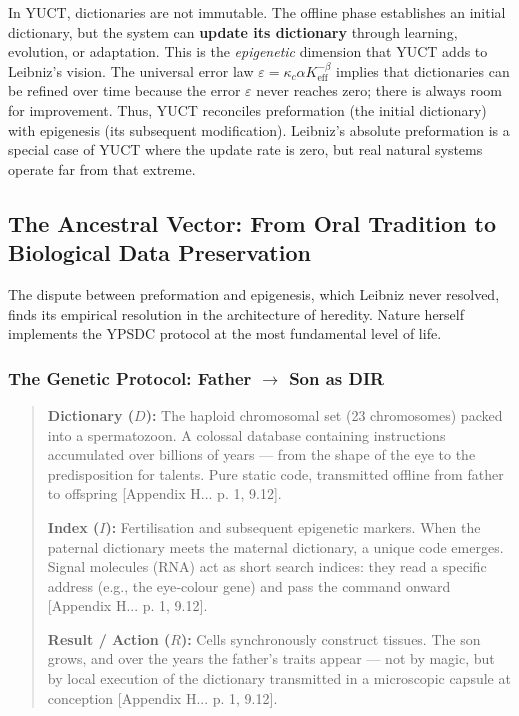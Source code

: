\documentclass[12pt,a4paper]{article}
\begin{document}
	In YUCT, dictionaries are not immutable. The offline phase establishes an initial dictionary, but the system can \textbf{update its dictionary} through learning, evolution, or adaptation. This is the \emph{epigenetic} dimension that YUCT adds to Leibniz’s vision. The universal error law \(\varepsilon = \kappa_c \alpha K_{\mathrm{eff}}^{-\beta}\) implies that dictionaries can be refined over time because the error \(\varepsilon\) never reaches zero; there is always room for improvement. Thus, YUCT reconciles preformation (the initial dictionary) with epigenesis (its subsequent modification). Leibniz’s absolute preformation is a special case of YUCT where the update rate is zero, but real natural systems operate far from that extreme.
	
	\subsection{The Ancestral Vector: From Oral Tradition to Biological Data Preservation}
	\label{subsec:ancestral-vector}
	
	The dispute between preformation and epigenesis, which Leibniz never resolved, finds its empirical resolution in the architecture of heredity. Nature herself implements the YPSDC protocol at the most fundamental level of life.
	
	\subsubsection{The Genetic Protocol: Father $\rightarrow$ Son as DIR}
	
	\begin{quote}
		\textbf{Dictionary ($D$):} The haploid chromosomal set (23 chromosomes) packed into a spermatozoon. A colossal database containing instructions accumulated over billions of years — from the shape of the eye to the predisposition for talents. Pure static code, transmitted offline from father to offspring [Appendix H... p. 1, 9.12].
		
		\textbf{Index ($I$):} Fertilisation and subsequent epigenetic markers. When the paternal dictionary meets the maternal dictionary, a unique code emerges. Signal molecules (RNA) act as short search indices: they read a specific address (e.g., the eye‑colour gene) and pass the command onward [Appendix H... p. 1, 9.12].
		
		\textbf{Result / Action ($R$):} Cells synchronously construct tissues. The son grows, and over the years the father’s traits appear — not by magic, but by local execution of the dictionary transmitted in a microscopic capsule at conception [Appendix H... p. 1, 9.12].
	\end{quote}
	
\end{document}
